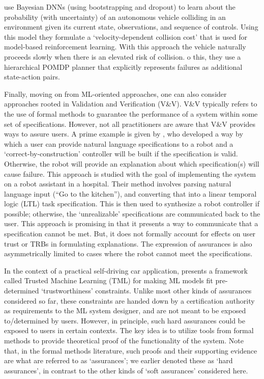 \citet{Kahn2017-vy} use Bayesian DNNs (using bootstrapping and dropout) to learn about the probability (with uncertainty) of an autonomous vehicle colliding in an environment given its current state, observations, and sequence of controls. Using this model they formulate a `velocity-dependent collision cost' that is used for model-based reinforcement learning. With this approach the vehicle naturally proceeds slowly when there is an elevated risk of collision. o this, they use a hierarchical POMDP planner that explicitly represents failures as additional state-action pairs.

Finally, moving on from ML-oriented approaches, one can also consider approaches rooted in Validation and Verification (V\&V). V\&V typically refers to the use of formal methods to guarantee the performance of a system within some set of specifications. However, not all practitioners are aware that V\&V provides ways to assure users. A prime example is given by \citet{Raman2013-mz}, who developed a way by which a user can provide natural language specifications to a robot and a `correct-by-construction' controller will be built if the specification is valid. Otherwise, the robot will provide an explanation about which specification(s) will cause failure. This approach is studied with the goal of implementing the system on a robot assistant in a hospital. Their method involves parsing natural language input (``Go to the kitchen''), and converting that into a linear temporal logic (LTL) task specification. This is then used to synthesize a robot controller if possible; otherwise, the `unrealizable' specifications are communicated back to the user. This approach is promising in that it presents a way to communicate that a specification cannot be met. But, it does not formally account for effects on user trust or TRBs in formulating explanations. The expression of assurances is also asymmetrically limited to cases where the robot cannot meet the specifications. 

In the context of a practical self-driving car application, \citet{Ghosh2016-dl} presents a framework called Trusted Machine Learning (TML) for making ML models fit pre-determined `trustworthiness' constraints. Unlike most other kinds of assurances considered so far, these constraints are handed down by a certification authority as requirements to the ML system designer, and are not meant to be exposed to/determined by users. However, in principle, such hard assurances could be exposed to users in certain contexts. The key idea is to utilize tools from formal methods to provide theoretical proof of the functionality of the system. Note that, in the formal methods literature, such proofs and their supporting evidence are what are referred to as `assurances'; we earlier denoted these as `hard assurances', in contrast to the other kinds of `soft assurances' considered here. 

